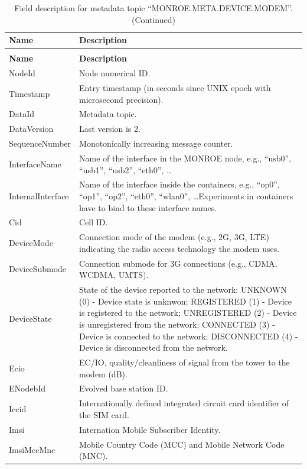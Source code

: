 \documentclass[a4paper,10pt]{article}
\newcommand{\monroe}{MONROE}
\begin{document}
\begin{appendices}
{\scriptsize
\begin{longtable}{p{3cm}p{12cm}}
	\caption{Field description for metadata topic ``MONROE.META.DEVICE.MODEM''.}\label{tab:metaDeviceModem}\\
	\toprule
	\textbf{Name} & \textbf{Description} \\	\midrule
	\endfirsthead
	\caption{Field description for metadata topic ``MONROE.META.DEVICE.MODEM''. (Continued)}\\
	\toprule
	\textbf{Name} & \textbf{Description} \\	\midrule
	\endhead
	NodeId & Node numerical ID.\\
	Timestamp & Entry timestamp (in seconds since UNIX epoch with microsecond precision).\\
	DataId & Metadata topic.\\
	DataVersion & Last version is \num{2}.\\
	SequenceNumber & Monotonically increasing message counter.\\
	InterfaceName & Name of the interface in the \monroe{} node, e.g., ``usb0'', ``usb1'', ``usb2'', ``eth0'', \ldots\\
	InternalInterface & Name of the interface inside the containers, e.g., ``op0'', ``op1'', ``op2'', ``eth0'', ``wlan0'', \ldots Experiments in containers have to bind to these interface names.\\
	Cid & Cell ID.\\
	DeviceMode & Connection mode of the modem (e.g., 2G, 3G, LTE) indicating the radio access technology the modem uses.\\
	DeviceSubmode & Connection submode for 3G connections (e.g., CDMA, WCDMA, UMTS).\\
	DeviceState & State of the device reported to the network: UNKNOWN (0) - Device state is unknwon; REGISTERED (1) - Device is registered to the network; UNREGISTERED (2) - Device is unregistered from the network; CONNECTED (3) - Device is connected to the network; DISCONNECTED (4) - Device is disconnected from the network.\\
	Ecio & EC/IO, quality/cleanliness of signal from the tower to the modem (dB).\\
	ENodebId & Evolved base station ID.\\
	Iccid & Internationally defined integrated circuit card identifier of the SIM card.\\
	Imsi & Internation Mobile Subscriber Identity.\\
	ImsiMccMnc & Mobile Country Code (MCC) and Mobile Network Code (MNC).\\

\end{longtable}}
\end{appendices}
\end{document}
